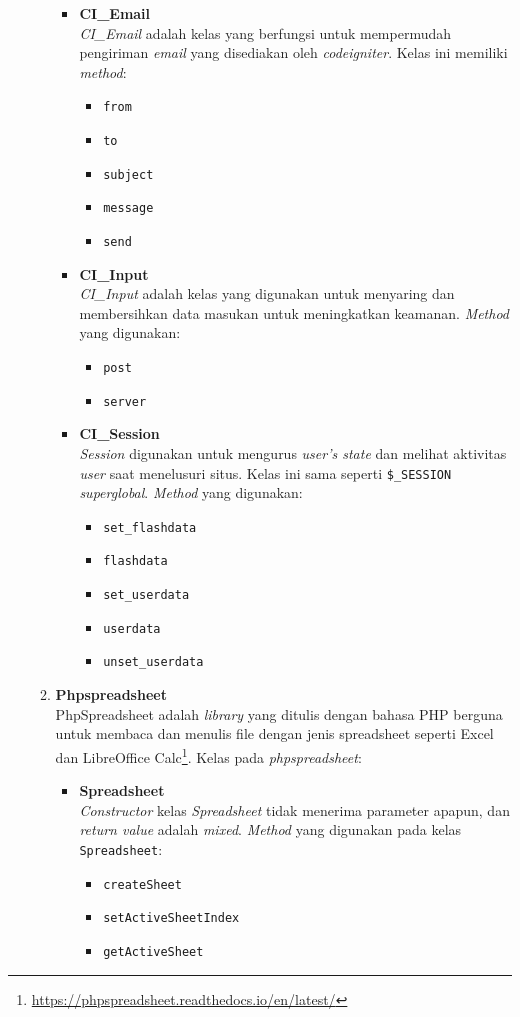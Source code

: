 \documentclass[a4paper,twoside]{article}
\begin{document}
\begin{enumerate}
\begin{enumerate}
\begin{itemize}
			\item \textbf{CI\_Email} \\
			\textit{CI\_Email} adalah kelas yang berfungsi untuk mempermudah pengiriman \textit{email} yang disediakan oleh \textit{codeigniter}. Kelas ini memiliki \textit{method}: 
			\begin{itemize}
				\item \texttt{from}
				\item \texttt{to}
				\item \texttt{subject}
				\item \texttt{message}
				\item \texttt{send}
			\end{itemize}
		\item \textbf{CI\_Input} \\ 
		\textit{CI\_Input} adalah kelas yang digunakan untuk menyaring dan membersihkan data masukan untuk meningkatkan keamanan. \textit{Method} yang digunakan:
		\begin{itemize}
			\item \texttt{post}
			\item \texttt{server}
		\end{itemize}
		\item \textbf{CI\_Session} \\
		\textit{Session} digunakan untuk mengurus  \textit{user's state} dan melihat aktivitas \textit{user} saat menelusuri situs. Kelas ini sama seperti \texttt{\$\_SESSION} \textit{superglobal}. \textit{Method} yang digunakan:
		\begin{itemize}
			\item \texttt{set\_flashdata}
			\item \texttt{flashdata}
			\item \texttt{set\_userdata}
			\item \texttt{userdata}
			\item \texttt{unset\_userdata}
		\end{itemize}	
		\end{itemize}
	
	\item \textbf{Phpspreadsheet} \\
	PhpSpreadsheet adalah \textit{library} yang ditulis dengan bahasa PHP berguna untuk membaca dan menulis file dengan jenis spreadsheet seperti Excel dan LibreOffice Calc\footnote{\url{https://phpspreadsheet.readthedocs.io/en/latest/}}. Kelas pada \textit{phpspreadsheet}:
	\begin{itemize}		 
		\item \textbf{Spreadsheet} \\ 
		\textit{Constructor} kelas \textit{Spreadsheet} tidak menerima parameter apapun, dan \textit{return value} adalah \textit{mixed}. \textit{Method} yang digunakan pada kelas \texttt{Spreadsheet}:
		\begin{itemize}
			\item \texttt{createSheet}
			\item \texttt{setActiveSheetIndex}
			\item \texttt{getActiveSheet}
		\end{itemize}
	

\end{itemize}
\end{enumerate}
\end{enumerate}
\end{document}
